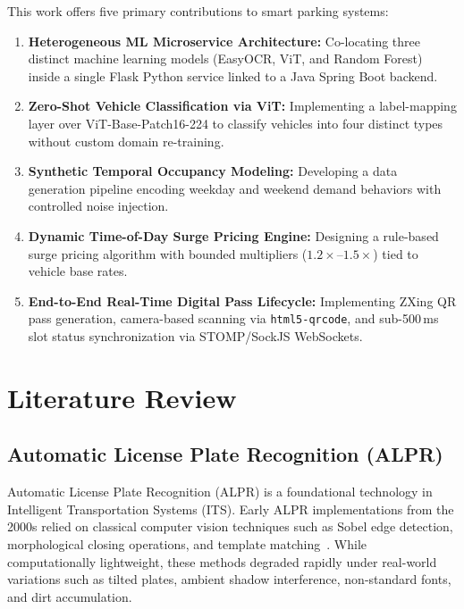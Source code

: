 \documentclass[conference,10pt]{IEEEtran}
\begin{document}
This work offers five primary contributions to smart parking systems:
\begin{enumerate}[leftmargin=*]
    \item \textbf{Heterogeneous ML Microservice Architecture:} Co-locating three distinct machine learning models (EasyOCR, ViT, and Random Forest) inside a single Flask Python service linked to a Java Spring Boot backend.
    \item \textbf{Zero-Shot Vehicle Classification via ViT:} Implementing a label-mapping layer over ViT-Base-Patch16-224 to classify vehicles into four distinct types without custom domain re-training.
    \item \textbf{Synthetic Temporal Occupancy Modeling:} Developing a data generation pipeline encoding weekday and weekend demand behaviors with controlled noise injection.
    \item \textbf{Dynamic Time-of-Day Surge Pricing Engine:} Designing a rule-based surge pricing algorithm with bounded multipliers ($1.2\times$--$1.5\times$) tied to vehicle base rates.
    \item \textbf{End-to-End Real-Time Digital Pass Lifecycle:} Implementing ZXing QR pass generation, camera-based scanning via \texttt{html5-qrcode}, and sub-500\,ms slot status synchronization via STOMP/SockJS WebSockets.
\end{enumerate}

\section{Literature Review}

\subsection{Automatic License Plate Recognition (ALPR)}

Automatic License Plate Recognition (ALPR) is a foundational technology in Intelligent Transportation Systems (ITS). Early ALPR implementations from the 2000s relied on classical computer vision techniques such as Sobel edge detection, morphological closing operations, and template matching~\cite{du2013}. While computationally lightweight, these methods degraded rapidly under real-world variations such as tilted plates, ambient shadow interference, non-standard fonts, and dirt accumulation.
\end{document}
